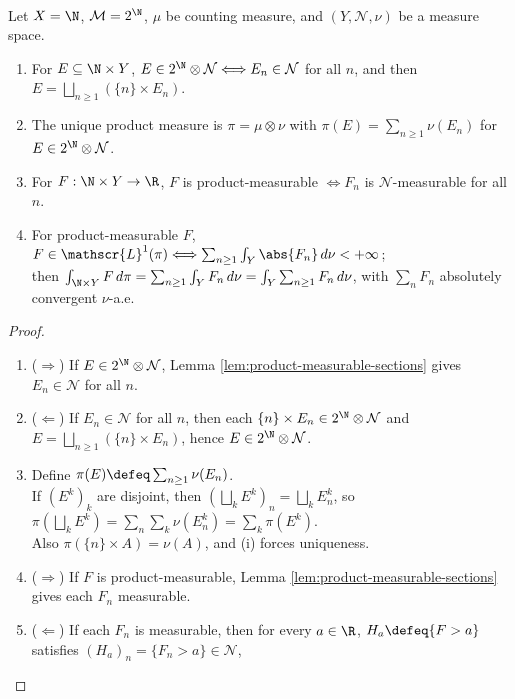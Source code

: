 \begin{proposition} \label{prop:counting-factor-product-integrals} \\
Let $X=\N$, $\mathcal{M}=2^\N$, $\mu$ be counting measure, and $(Y,\mathcal{N},\nu)$ be a measure space.
\begin{enumerate}[label=(\roman*)]
\setlength{\itemsep}{0pt}
\item For $E\subseteq\N\times Y$, $E\in2^\N\otimes\mathcal{N}\Longleftrightarrow E_n\in\mathcal{N}$ for all $n$, and then $E=\bigsqcup_{n\geq1}(\{n\}\times E_n)$.
\item The unique product measure is $\pi=\mu\otimes\nu$ with $\pi(E)=\sum_{n\geq1}\nu(E_n)$ for $E\in2^\N\otimes\mathcal{N}$.
\item For $F:\N\times Y\to\R$, $F$ is product-measurable $\Longleftrightarrow F_n$ is $\mathcal{N}$-measurable for all $n$.
\item For product-measurable $F$, $F\in\mathscr{L}^1(\pi)\Longleftrightarrow\sum_{n\geq1}\int_Y\abs{F_n}\,d\nu<+\infty$;\\
then $\int_{\N\times Y}F\,d\pi=\sum_{n\geq1}\int_YF_n\,d\nu=\int_Y\sum_{n\geq1}F_n\,d\nu$, with $\sum_nF_n$ absolutely convergent $\nu$-a.e.
\end{enumerate}
\begin{proof}
\begin{enumerate}[label=(\roman*)]
\setlength{\itemsep}{0pt}
\item[$(i)$] ($\Rightarrow$) If $E\in2^\N\otimes\mathcal{N}$, Lemma \ref{lem:product-measurable-sections} gives $E_n\in\mathcal{N}$ for all $n$.
\item[$(i)$] ($\Leftarrow$) If $E_n\in\mathcal{N}$ for all $n$, then each $\{n\}\times E_n\in2^\N\otimes\mathcal{N}$ and $E=\bigsqcup_{n\geq1}(\{n\}\times E_n)$, hence $E\in2^\N\otimes\mathcal{N}$.
\item[$(ii)$] Define $\pi(E)\defeq\sum_{n\geq1}\nu(E_n)$.\\
If $(E^k)_k$ are disjoint, then $(\bigsqcup_kE^k)_n=\bigsqcup_kE^k_n$, so $\pi(\bigsqcup_kE^k)=\sum_n\sum_k\nu(E^k_n)=\sum_k\pi(E^k)$.\\
Also $\pi(\{n\}\times A)=\nu(A)$, and (i) forces uniqueness.
\item[$(iii)$] ($\Rightarrow$) If $F$ is product-measurable, Lemma \ref{lem:product-measurable-sections} gives each $F_n$ measurable.
\item[$(iii)$] ($\Leftarrow$) If each $F_n$ is measurable, then for every $a\in\R$, $H_a\defeq\{F>a\}$ satisfies $(H_a)_n=\{F_n>a\}\in\mathcal{N}$,\\

\end{enumerate}
\end{proof}
\end{proposition}
